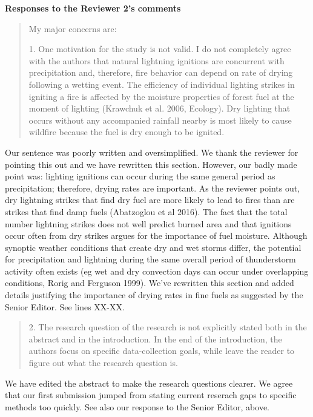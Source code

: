 \documentclass[letterpaper, 12pt]{letter}
\begin{document}
\begin{letter}{}
{\bf Responses to the Reviewer 2's comments}

\begin{quote}

  My major concerns are:
  
  1. One motivation for the study is not valid. I do not completely agree with
  the authors that natural lightning ignitions are concurrent with
  precipitation and, therefore, fire behavior can depend on rate of drying
  following a wetting event. The efficiency of individual lighting strikes in
  igniting a fire is affected by the moisture properties of forest fuel at the
  moment of lighting (Krawchuk et al. 2006, Ecology). Dry lighting that occurs
  without any accompanied rainfall nearby is most likely to cause wildfire
  because the fuel is dry enough to be ignited.
\end{quote}

Our sentence was poorly written and oversimplified. We thank the reviewer for
pointing this out and we have rewritten this section. However, our badly made
point was: lighting ignitions can occur during the same general period as
precipitation; therefore, drying rates are important. As the reviewer points
out, dry lightning strikes that find dry fuel are more likely to lead to fires
than are strikes that find damp fuels (Abatzoglou et al 2016). The fact that
the total number lightning strikes does not well predict burned area and that
ignitions occur often from dry strikes argues for the importance of fuel
moisture. Although synoptic weather conditions that create dry and wet storms
differ, the potential for precipitation and lightning during the same overall
period of thunderstorm activity often exists (eg wet and dry convection days
can occur under overlapping conditions, Rorig and Ferguson 1999). We've
rewritten this section and added details justifying the importance of drying
rates in fine fuels as suggested by the Senior Editor. See lines XX-XX.

\begin{quote}
  2. The research question of the research is not explicitly stated both in the
  abstract and in the introduction. In the end of the introduction, the authors
  focus on specific data-collection goals, while leave the reader to figure out
  what the research question is.
\end{quote}

We have edited the abstract to make the research questions clearer. We agree
that our first submission jumped from stating current reserach gaps to specific
methods too quickly. See also our response to the Senior Editor, above.



\end{letter}
\end{document}
